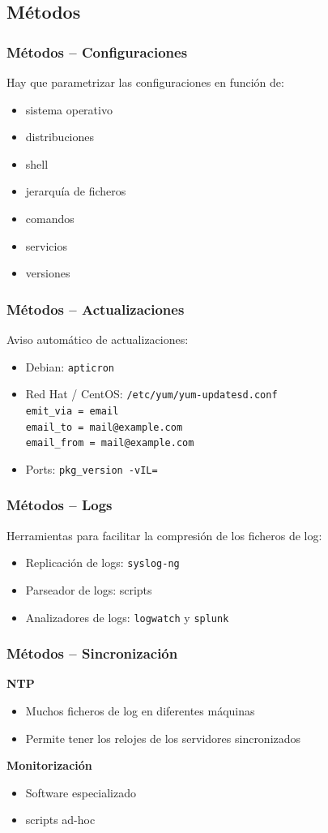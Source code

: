 \documentclass{beamer}
\begin{document}
\subsection{Métodos}
\begin{frame}
  \frametitle{Métodos -- Configuraciones}
  Hay que parametrizar las configuraciones en función de:
  \begin{itemize}
    \item sistema operativo
    \item distribuciones
    \item shell
    \item jerarquía de ficheros
    \item comandos
    \item servicios
    \item versiones
  \end{itemize}
\end{frame}

\begin{frame}
  \frametitle{Métodos -- Actualizaciones}
  Aviso automático de actualizaciones:
  \begin{itemize}
    \item Debian: \texttt{apticron}
    \item Red Hat / CentOS: \texttt{/etc/yum/yum-updatesd.conf} \\
      \texttt{emit\_via = email \\
      email\_to = mail@example.com \\
      email\_from = mail@example.com \\}
    \item Ports: \texttt{pkg\_version -vIL=}
  \end{itemize}
\end{frame}

\begin{frame}
  \frametitle{Métodos -- Logs}
  Herramientas para facilitar la compresión de los ficheros de log:
  \begin{itemize}
    \item Replicación de logs: \texttt{syslog-ng}
    \item Parseador de logs: scripts 
    \item Analizadores de logs: \texttt{logwatch} y \texttt{splunk}
  \end{itemize}
\end{frame}

\begin{frame}
  \frametitle{Métodos -- Sincronización}
  \textbf{NTP}
  \begin{itemize}
    \item Muchos ficheros de log en diferentes máquinas
    \item Permite tener los relojes de los servidores sincronizados
  \end{itemize}
  \vspace{0.5cm}
  \textbf{Monitorización}
  \begin{itemize}
    \item Software especializado
    \item scripts ad-hoc
  \end{itemize}
\end{frame}
\end{document}

